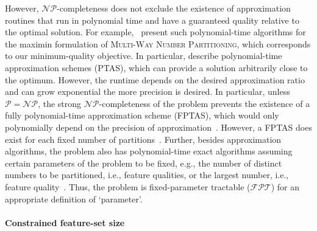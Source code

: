 \documentclass{article}
\theoremstyle{definition}
\begin{document}
However, $\mathcal{NP}$-completeness does not exclude the existence of approximation routines that run in polynomial time and have a guaranteed quality relative to the optimal solution.
For example, \cite{alon1998approximation, deuermeyer1982scheduling, woeginger1997polynomial}~present such polynomial-time algorithms for the maximin formulation of \textsc{Multi-Way Number Partitioning}, which corresponds to our minimum-quality objective.
In particular, \cite{alon1998approximation, woeginger1997polynomial} describe polynomial-time approximation schemes (PTAS), which can provide a solution arbitrarily close to the optimum.
However, the runtime depends on the desired approximation ratio and can grow exponential the more precision is desired.
In particular, unless $\mathcal{P}=\mathcal{NP}$, the strong $\mathcal{NP}$-completeness of the problem prevents the existence of a fully polynomial-time approximation scheme (FPTAS), which would only polynomially depend on the precision of approximation~\cite{alon1998approximation, woeginger1997polynomial}.
However, a FPTAS does exist for each fixed number of partitions~\cite{sahni1976algorithms}.
Further, besides approximation algorithms, the problem also has polynomial-time exact algorithms assuming certain parameters of the problem to be fixed, e.g., the number of distinct numbers to be partitioned, i.e., feature qualities, or the largest number, i.e., feature quality~\cite{mnich2018parameterized}.
Thus, the problem is fixed-parameter tractable ($\mathcal{FPT}$) for an appropriate definition of `parameter'.

\paragraph{Constrained feature-set size}
\end{document}
